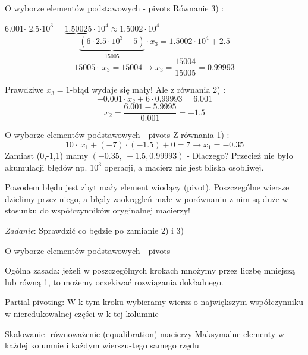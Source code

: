 \begin{frame}{ O wyborze elementów podstawowych - pivots}
Równanie 3) :
\begin{center}
6.001$\cdot$ 2.5$\cdot 10^{3}=\underbrace{1.5002}5\cdot 10^{4} \approx 1.5002\cdot 10^{4}$
$$
\underbrace{(6\cdot 2.5\cdot 10^{3}+5)}_{15005}\cdot x_{3}=1.5002\cdot 10^{4}+2.5
$$
$$
15005\cdot\ x_{3}=15004\rightarrow x_{3}=\frac{15004}{15005}=0.99993
$$
\end{center}
Prawdziwe $x_{3}=1$-błąd wydaje się mały!
\newline
Ale z równania 2) :
$$
-0.001\cdot x_{2}+6\cdot 0.99993=6.001
$$
$$
x_{2}=\frac{6.001-5.9995}{0.001}=\underline{-1.5}
$$
\end{frame}
\begin{frame}{ O wyborze elementów podstawowych - pivots}
Z równania 1) :
$$
10\cdot\ x_{1}+(-7)\cdot(-1.5)+0=7\rightarrow x_{1}=\underline{-0.35}
$$
Zamiast (0,-1,1) mamy $(-0.35,\ -1.5,0.99993)$ - Dlaczego? \newline 
Przecież nie było akumulacji błędów np. $10^{3}$ operacji, a macierz nie jest bliska osobliwej.
\begin{alertblock}{}
Powodem błędu jest zbyt mały element wiodący (pivot). Poszczególne wiersze dzielimy przez niego, a błędy zaokrągleń małe w porównaniu z nim są duże w stosunku do współczynników oryginalnej macierzy!
\end{alertblock}
\begin{flushright}
\textit{Zadanie}: Sprawdzić co będzie po zamianie 2) i 3) 
\end{flushright}
\end{frame}
\begin{frame}{ O wyborze elementów podstawowych - pivots}

Ogólna zasada: jeżeli w poszczególnych krokach mnożymy przez liczbę mniejszą lub równą 1, to możemy oczekiwać rozwiązania dokładnego.
\begin{exampleblock}{Partial pivoting:}
W $\mathrm{k}$-tym kroku wybieramy wiersz o największym współczynniku w nieredukowalnej części w $\mathrm{k}$-tej kolumnie

\end{exampleblock}

\begin{exampleblock}{Skalowanie -równoważenie (equalibration) macierzy}
Maksymalne elementy w każdej kolumnie i każdym wierszu-tego samego rzędu
\end{exampleblock}

\end{frame}
